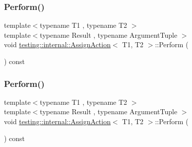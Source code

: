 \mbox{\label{classtesting_1_1internal_1_1_assign_action_a540912bec1f4de6fc4c7de26312e4586}} 
\subsubsection{\texorpdfstring{Perform()}{Perform()}\hspace{0.1cm}{\footnotesize\ttfamily [1/3]}}
{\footnotesize\ttfamily template$<$typename T1 , typename T2 $>$ \\
template$<$typename Result , typename Argument\+Tuple $>$ \\
void \mbox{\hyperlink{classtesting_1_1internal_1_1_assign_action}{testing\+::internal\+::\+Assign\+Action}}$<$ T1, T2 $>$\+::Perform (\begin{DoxyParamCaption}\item[{const Argument\+Tuple \&}]{ }\end{DoxyParamCaption}) const\hspace{0.3cm}{\ttfamily [inline]}}

\mbox{\label{classtesting_1_1internal_1_1_assign_action_a540912bec1f4de6fc4c7de26312e4586}} 
\subsubsection{\texorpdfstring{Perform()}{Perform()}\hspace{0.1cm}{\footnotesize\ttfamily [2/3]}}
{\footnotesize\ttfamily template$<$typename T1 , typename T2 $>$ \\
template$<$typename Result , typename Argument\+Tuple $>$ \\
void \mbox{\hyperlink{classtesting_1_1internal_1_1_assign_action}{testing\+::internal\+::\+Assign\+Action}}$<$ T1, T2 $>$\+::Perform (\begin{DoxyParamCaption}\item[{const Argument\+Tuple \&}]{ }\end{DoxyParamCaption}) const\hspace{0.3cm}{\ttfamily [inline]}}

